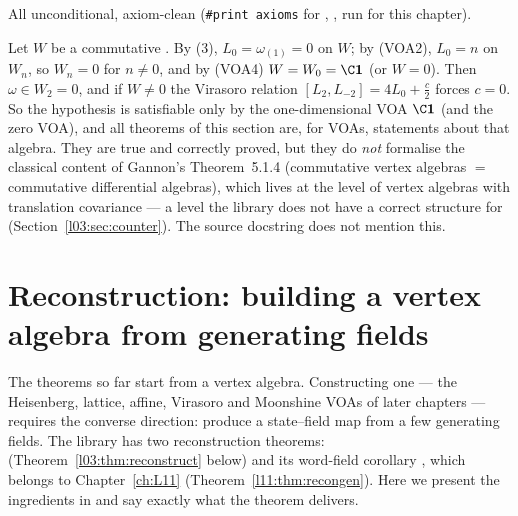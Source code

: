 \begin{status}
All unconditional, axiom-clean (\texttt{\#print axioms} for ,
,  run for this chapter).
\end{status}

\begin{warning}[title={Theorem 5.1.4 at the VOA level is a statement about the trivial VOA}]
Let $W$ be a commutative . By (3), $L_0 = \omega_{(1)} = 0$ on $W$; by
(VOA2), $L_0 = n$ on $W_n$, so $W_n = 0$ for $n\ne0$, and by (VOA4) $W = W_0 = \C\lthreevac$ (or $W = 0$).
Then $\omega\in W_2 = 0$, and if $W\ne0$ the Virasoro relation $[L_2,L_{-2}] = 4L_0+\frac c2$ forces
$c = 0$. So the hypothesis  is satisfiable only by the one-dimensional VOA
$\C\lthreevac$ (and the zero VOA), and all theorems of this section are, for VOAs, statements about that
algebra. They are true and correctly proved, but they do \emph{not} formalise the classical
content of Gannon's Theorem~5.1.4 (commutative vertex algebras $=$ commutative differential
algebras), which lives at the level of vertex algebras with translation covariance --- a level the
library does not have a correct structure for (Section~\ref{l03:sec:counter}). The source docstring
does not mention this.
\end{warning}

\section[Reconstruction]{Reconstruction: building a vertex algebra from generating fields}\label{l03:sec:recon}

The theorems so far start from a vertex algebra. Constructing one --- the Heisenberg, lattice,
affine, Virasoro and Moonshine VOAs of later chapters --- requires the converse direction:
produce a state--field map from a few generating fields. The library has two reconstruction theorems:
 (Theorem~\ref{l03:thm:reconstruct} below) and its word-field corollary
, which belongs to Chapter~\ref{ch:L11}
(Theorem~\ref{l11:thm:recongen}).
Here we present the ingredients in 
and say exactly what the theorem delivers.

